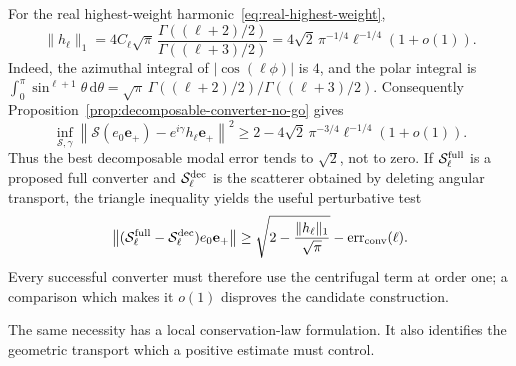 \documentclass[11pt]{article}
\newcommand{\dd}{\,\mathrm d}
\theoremstyle{definition}
\theoremstyle{remark}
\begin{document}
For the real highest-weight harmonic~\eqref{eq:real-highest-weight},
\begin{equation}
 \|h_\ell\|_1
 =4C_\ell\sqrt\pi\,
   \frac{\Gamma((\ell+2)/2)}{\Gamma((\ell+3)/2)}
 =4\sqrt2\,\pi^{-1/4}\ell^{-1/4}(1+o(1)).
 \label{eq:highest-weight-L1}
\end{equation}
Indeed, the azimuthal integral of $|\cos(\ell\phi)|$ is $4$, and the polar
integral is
$\int_0^\pi\sin^{\ell+1}\theta\dd\theta
=\sqrt\pi\,\Gamma((\ell+2)/2)/\Gamma((\ell+3)/2)$.
Consequently Proposition~\ref{prop:decomposable-converter-no-go} gives
\begin{equation}
 \inf_{\mathcal S,\gamma}
 \left\|\mathcal S(e_0\mathbf e_+)
       -e^{i\gamma}h_\ell\mathbf e_+\right\|^2
 \geq
 2-4\sqrt2\,\pi^{-3/4}\ell^{-1/4}(1+o(1)).
 \label{eq:highest-decomposable-error}
\end{equation}
Thus the best decomposable modal error tends to $\sqrt2$, not to zero.  If
$\mathcal S_\ell^{\rm full}$ is a proposed full converter and
$\mathcal S_\ell^{\rm dec}$ is the scatterer obtained by deleting angular
transport, the triangle inequality yields the useful perturbative test
\begin{equation}
 \left\|(\mathcal S_\ell^{\rm full}
              -\mathcal S_\ell^{\rm dec})e_0\mathbf e_+\right\|
 \geq \sqrt{2-\frac{\|h_\ell\|_1}{\sqrt\pi}}
       -\operatorname{err}_{\rm conv}(\ell).
 \label{eq:angular-transport-order-one}
\end{equation}
Every successful converter must therefore use the centrifugal term at order
one; a comparison which makes it $o(1)$ disproves the candidate construction.

The same necessity has a local conservation-law formulation.  It also
identifies the geometric transport which a positive estimate must control.
\end{document}
